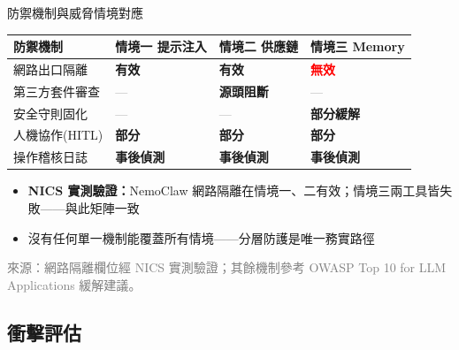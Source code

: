 \documentclass[aspectratio=1610]{Common/MyCourseBeamer}
\begin{document}
\begin{frame}{防禦機制與威脅情境對應}

	{\small\renewcommand{\arraystretch}{1.2}
	\begin{tabularx}{\linewidth}{Xp{1.6cm}p{1.6cm}p{1.6cm}}
		\toprule
		防禦機制 & 情境一 提示注入 & 情境二 供應鏈 & 情境三 Memory \\
		\midrule
		網路出口隔離 & \textcolor{green!60!black}{\textbf{有效}} & \textcolor{green!60!black}{\textbf{有效}} & \textcolor{red}{\textbf{無效}} \\
		\midrule
		第三方套件審查 & \textcolor{gray}{—} & \textcolor{green!60!black}{\textbf{源頭阻斷}} & \textcolor{gray}{—} \\
		\midrule
		安全守則固化 & \textcolor{gray}{—} & \textcolor{gray}{—} & \textcolor{orange!80!black}{\textbf{部分緩解}} \\
		\midrule
		人機協作(HITL) & \textcolor{orange!80!black}{\textbf{部分}} & \textcolor{orange!80!black}{\textbf{部分}} & \textcolor{orange!80!black}{\textbf{部分}} \\
		\midrule
		操作稽核日誌 & \textcolor{blue!60!black}{\textbf{事後偵測}} & \textcolor{blue!60!black}{\textbf{事後偵測}} & \textcolor{blue!60!black}{\textbf{事後偵測}} \\
		\bottomrule
	\end{tabularx}
	}

	\vspace{0.2em}
	\begin{itemize}
		\item \textbf{NICS 實測驗證：}NemoClaw 網路隔離在情境一、二有效；情境三兩工具皆失敗——與此矩陣一致
		\item \alert{沒有任何單一機制能覆蓋所有情境}——分層防護是唯一務實路徑
	\end{itemize}
	{\scriptsize\textcolor{gray}{來源：網路隔離欄位經 NICS 實測驗證\cite{nics2026}；其餘機制參考 OWASP Top 10 for LLM Applications 緩解建議\cite{owasp2025}。}}

\end{frame}


\subsection{衝擊評估}
\end{document}
